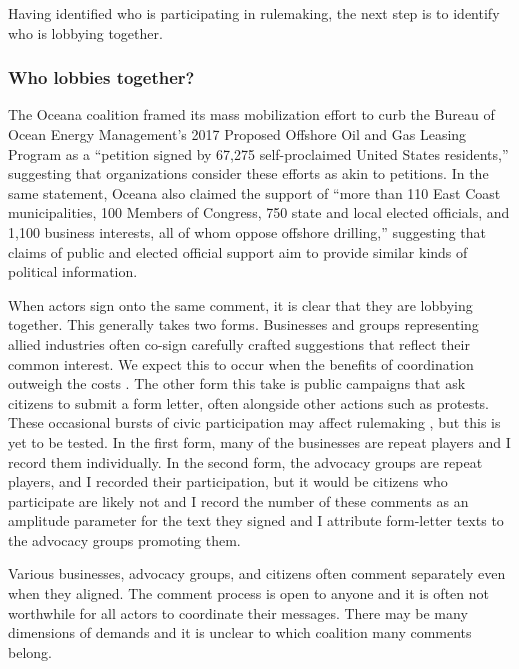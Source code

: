 Having identified who is participating in rulemaking, the next step is to identify who is lobbying together.

\subsubsection{Who lobbies together?}
The Oceana coalition framed its mass mobilization effort to curb the  Bureau of Ocean Energy Management's 2017 Proposed Offshore Oil and Gas Leasing Program as a ``petition signed by 67,275 self-proclaimed United States residents,'' suggesting that organizations consider these efforts as akin to petitions. In the same statement, Oceana also claimed the support of ``more than 110 East Coast municipalities, 100 Members of Congress, 750 state and local elected officials, and 1,100 business interests, all of whom oppose offshore drilling,'' suggesting that claims of public and elected official support aim to provide similar kinds of political information. 

When actors sign onto the same comment, it is clear that they are lobbying together. This generally takes two forms. Businesses and groups representing allied industries often co-sign carefully crafted suggestions that reflect their common interest. We expect this to occur when the benefits of coordination outweigh the costs \citep{Yackee2006JOP}. The other form this take is public campaigns that ask citizens to submit a form letter, often alongside other actions such as protests. These occasional bursts of civic participation may affect rulemaking \citep{Coglianese2001}, but this is yet to be tested. In the first form, many of the businesses are repeat players and I record them individually. In the second form, the advocacy groups are repeat players, and I recorded their participation, but it would be citizens who participate are likely not and I record the number of these comments as an amplitude parameter for the text they signed and I attribute form-letter texts to the advocacy groups promoting them.

Various businesses, advocacy groups, and citizens often comment separately even when they aligned. The comment process is open to anyone and it is often not worthwhile for all actors to coordinate their messages. There may be many dimensions of demands and it is unclear to which coalition many comments belong.


